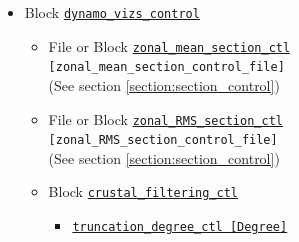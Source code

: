 \begin{itemize}
    \begin{itemize} \label{href_i:visual_control}
	\item \hyperref[href_t:i_step_sectioning_ctl]
        {\tt i\_step\_sectioning\_ctl  [ISTEP\_SECTION]}
    \item Array \hyperref[href_t:cross_section_ctl]{\tt cross\_section\_ctl}
		\begin{itemize}
        \item File or Block {\tt cross\_section\_ctl} \\
                            {\tt [section\_control\_file]} \\
								(See section \ref{section:section_control})
		\end{itemize}
%
    \item \hyperref[href_t:i_step_isosurface_ctl]
		{\tt i\_step\_isosurface\_ctl  [ISTEP\_ISOSURFACE]}
    \item Array \hyperref[href_t:isosurface_ctl]{\tt isosurface\_ctl}
		\begin{itemize}
		\item File or Block {\tt isosurface\_ctl} \\
                            {\tt [isosurface\_control\_file]} \\
								(See section \ref{section:isosurface_control})
		\end{itemize}
    \end{itemize}
%
\item Block \hyperref[href_t:dynamo_vizs_control]{\tt dynamo\_vizs\_control}
	\begin{itemize} \label{href_i:dynamo_vizs_control}
		\item File or Block \hyperref[href_t:zonal_mean_section_ctl]
							{\tt zonal\_mean\_section\_ctl} \\
							{\tt [zonal\_mean\_section\_control\_file]} \\
								(See section \ref{section:section_control})
		\item File or Block \hyperref[href_t:zonal_RMS_section_ctl]
							{\tt zonal\_RMS\_section\_ctl} \\
                            {\tt [zonal\_RMS\_section\_control\_file]} \\
                                (See section \ref{section:section_control})
%
		\item Block \hyperref[href_t:crustal_filtering_ctl]{\tt crustal\_filtering\_ctl}
			\begin{itemize}
				\item \hyperref[href_t:crustal_filtering_ctl]
						{\tt truncation\_degree\_ctl          [Degree]}
			\end{itemize}
	\end{itemize}
\end{itemize}
%
%
%
